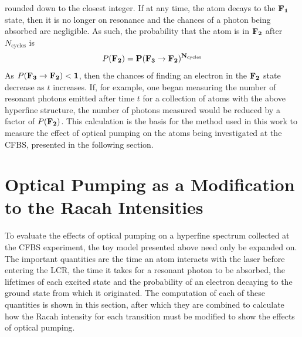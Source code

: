 rounded down to the closest integer. If at any time, the atom decays to the $\bf{F}_1$ state, then it is no longer on resonance and the chances of a photon being absorbed are negligible. As such, the probability that the atom is in $\bf{F}_2$ after $N_{\mathrm{cycles}}$ is
\begin{equation}
P(\bf{F}_2) = P(\bf{F}_3 \rightarrow \bf{F}_2)^{N_{\mathrm{cycles}}}
\end{equation}
As $P(\bf{F}_3 \rightarrow \bf{F}_2) < 1$, then the chances of finding an electron in the $\bf{F}_2$ state decrease as $t$ increases. If, for example, one began measuring the number of resonant photons emitted after time $t$ for a collection of atoms with the above hyperfine structure, the number of photons measured would be reduced by a factor of $P(\bf{F}_2)$. This calculation is the basis for the method used in this work to measure the effect of optical pumping on the atoms being investigated at the CFBS, presented in the following section.

\section{Optical Pumping as a Modification to the Racah Intensities}
To evaluate the effects of optical pumping on a hyperfine spectrum collected at the CFBS experiment, the toy model presented above need only be expanded on. The important quantities are the time an atom interacts with the laser before entering the LCR, the time it takes for a resonant photon to be absorbed, the lifetimes of each excited state and the probability of an electron decaying to the ground state from which it originated. The computation of each of these quantities is shown in this section, after which they are combined to calculate how the Racah intensity for each transition must be modified to show the effects of optical pumping.


